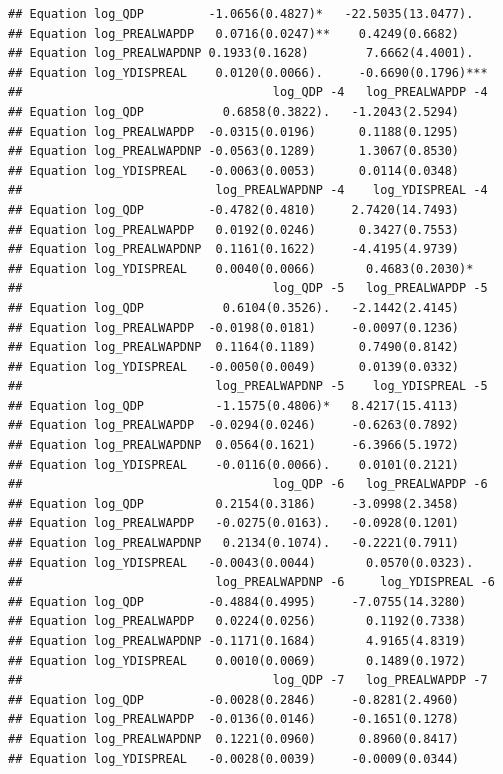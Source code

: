 \documentclass[11pt,preprint, authoryear]{elsarticle}
\numberwithin{equation}{section}
\numberwithin{figure}{section}
\numberwithin{table}{section}
\begin{document}
\begin{verbatim}
## Equation log_QDP         -1.0656(0.4827)*   -22.5035(13.0477).  
## Equation log_PREALWAPDP   0.0716(0.0247)**    0.4249(0.6682)    
## Equation log_PREALWAPDNP 0.1933(0.1628)        7.6662(4.4001).  
## Equation log_YDISPREAL    0.0120(0.0066).     -0.6690(0.1796)***
##                                   log_QDP -4   log_PREALWAPDP -4
## Equation log_QDP           0.6858(0.3822).   -1.2043(2.5294)    
## Equation log_PREALWAPDP  -0.0315(0.0196)      0.1188(0.1295)    
## Equation log_PREALWAPDNP -0.0563(0.1289)      1.3067(0.8530)    
## Equation log_YDISPREAL   -0.0063(0.0053)      0.0114(0.0348)    
##                           log_PREALWAPDNP -4    log_YDISPREAL -4
## Equation log_QDP         -0.4782(0.4810)     2.7420(14.7493)    
## Equation log_PREALWAPDP   0.0192(0.0246)      0.3427(0.7553)    
## Equation log_PREALWAPDNP  0.1161(0.1622)     -4.4195(4.9739)    
## Equation log_YDISPREAL    0.0040(0.0066)       0.4683(0.2030)*  
##                                   log_QDP -5   log_PREALWAPDP -5
## Equation log_QDP           0.6104(0.3526).   -2.1442(2.4145)    
## Equation log_PREALWAPDP  -0.0198(0.0181)     -0.0097(0.1236)    
## Equation log_PREALWAPDNP  0.1164(0.1189)      0.7490(0.8142)    
## Equation log_YDISPREAL   -0.0050(0.0049)      0.0139(0.0332)    
##                           log_PREALWAPDNP -5    log_YDISPREAL -5
## Equation log_QDP          -1.1575(0.4806)*   8.4217(15.4113)    
## Equation log_PREALWAPDP  -0.0294(0.0246)     -0.6263(0.7892)    
## Equation log_PREALWAPDNP  0.0564(0.1621)     -6.3966(5.1972)    
## Equation log_YDISPREAL    -0.0116(0.0066).    0.0101(0.2121)    
##                                   log_QDP -6   log_PREALWAPDP -6
## Equation log_QDP          0.2154(0.3186)     -3.0998(2.3458)    
## Equation log_PREALWAPDP   -0.0275(0.0163).   -0.0928(0.1201)    
## Equation log_PREALWAPDNP   0.2134(0.1074).   -0.2221(0.7911)    
## Equation log_YDISPREAL   -0.0043(0.0044)       0.0570(0.0323).  
##                           log_PREALWAPDNP -6     log_YDISPREAL -6
## Equation log_QDP         -0.4884(0.4995)     -7.0755(14.3280)    
## Equation log_PREALWAPDP   0.0224(0.0256)       0.1192(0.7338)    
## Equation log_PREALWAPDNP -0.1171(0.1684)       4.9165(4.8319)    
## Equation log_YDISPREAL    0.0010(0.0069)       0.1489(0.1972)    
##                                   log_QDP -7   log_PREALWAPDP -7
## Equation log_QDP         -0.0028(0.2846)     -0.8281(2.4960)    
## Equation log_PREALWAPDP  -0.0136(0.0146)     -0.1651(0.1278)    
## Equation log_PREALWAPDNP  0.1221(0.0960)      0.8960(0.8417)    
## Equation log_YDISPREAL   -0.0028(0.0039)     -0.0009(0.0344)    

\end{verbatim}
\end{document}
